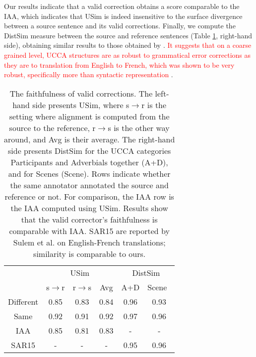 \documentclass[a4paper, 11pt]{article}
\begin{document}
Our results indicate that a valid correction obtains a score comparable
to the IAA, which indicates that {\sc USim} is indeed
insensitive to the surface divergence between a source sentence and its valid corrections.
Finally, we compute the {\sc DistSim} measure
between the source and reference sentences (Table \ref{tab:Distances}, right-hand side),
obtaining similar results to those obtained by . \textcolor{red}{It suggests that on a coarse grained level, UCCA structures are as robust to grammatical error corrections as they are to translation from English to French, which was shown to be very robust, specifically more than syntactic representation \cite{sulem2015conceptual}}.
\begin{table}
	\small
	\centering
	\singlespacing
	\begin{tabular}{c|c|c|c||c|c|}
		\cline{2-6} 
		& \multicolumn{3}{c||}{\sc USim} & \multicolumn{2}{c|}{\sc DistSim}\\ \cline{2-6}
		& s$\rightarrow$r & r$\rightarrow$s & Avg & A+D & Scene\
		\\
		\hline
		Different & 0.85 & 0.83 & 0.84 & 0.96 & 0.93
		\\
		Same & 0.92 & 0.91 & 0.92 & 0.97 & 0.96
		\\
		\hline
		\hline
		IAA & 0.85 & 0.81 & 0.83 & - & -
		\\
		\hline
		SAR15 & - & - & - & 0.95 & 0.96 \\
		\hline
	\end{tabular}
	\caption{\label{tab:Distances}
		The faithfulness of valid corrections.
		The left-hand side presents {\sc USim},
		where s$\rightarrow$r is the setting where alignment is computed from the source to the reference,
		r$\rightarrow$s is the other way around, and Avg is their average.
		The right-hand side presents {\sc DistSim} for the UCCA categories Participants and Adverbials
		together (A+D), and for Scenes (Scene).
		Rows indicate whether the same annotator annotated the source and reference or not.
		For comparison, the IAA row is the IAA computed using {\sc USim}.
		Results show that the valid corrector's faithfulness is comparable with IAA.
		SAR15 are reported by Sulem et al. on English-French
		translations; similarity is comparable to ours.}
\end{table}
\end{document}
